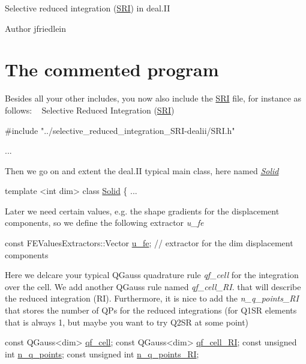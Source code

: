 Selective reduced integration (\hyperlink{namespaceSRI}{S\+RI}) in deal.\+II\begin{DoxyAuthor}{Author}
jfriedlein
\end{DoxyAuthor}
\hypertarget{index_code}{}\section{The commented program}\label{index_code}

\begin{DoxyCode}
\end{DoxyCode}
 Besides all your other includes, you now also include the \hyperlink{namespaceSRI}{S\+RI} file, for instance as follows\+: ~\newline
Selective Reduced Integration (\hyperlink{namespaceSRI}{S\+RI}) 
\begin{DoxyCode}
\textcolor{preprocessor}{#include "../selective\_reduced\_integration\_SRI-dealii/SRI.h"}
 
...
\end{DoxyCode}
 Then we go on and extent the deal.\+II typical main class, here named {\itshape \hyperlink{classSolid}{Solid}} 
\begin{DoxyCode}
\textcolor{keyword}{template} <\textcolor{keywordtype}{int} dim>
\textcolor{keyword}{class }\hyperlink{classSolid}{Solid}
\{
    ...
\end{DoxyCode}
 Later we need certain values, e.\+g. the shape gradients for the displacement components, so we define the following extractor {\itshape u\+\_\+fe} 
\begin{DoxyCode}
\textcolor{keyword}{const} FEValuesExtractors::Vector \hyperlink{assembly__routine__SRI_8cc_ae50a49c136e49c33fcd5a555a00009dd}{u\_fe}; \textcolor{comment}{// extractor for the dim displacement components}
\end{DoxyCode}
 Here we delcare your typical Q\+Gauss quadrature rule {\itshape qf\+\_\+cell} for the integration over the cell. We add another Q\+Gauss rule named {\itshape qf\+\_\+cell\+\_\+\+RI}. that will describe the reduced integration (RI). Furthermore, it is nice to add the {\itshape n\+\_\+q\+\_\+points\+\_\+\+RI} that stores the number of Q\+Ps for the reduced integrations (for Q1\+SR elements that is always 1, but maybe you want to try Q2\+SR at some point) 
\begin{DoxyCode}
\textcolor{keyword}{const} QGauss<dim>                \hyperlink{assembly__routine__SRI_8cc_aaaceb34a5b42a4954b2e893607c1bdef}{qf\_cell};
\textcolor{keyword}{const} QGauss<dim>                \hyperlink{assembly__routine__SRI_8cc_ab9727a7376e2656d3cd40c65ac7efb81}{qf\_cell\_RI};
\textcolor{keyword}{const} \textcolor{keywordtype}{unsigned} \textcolor{keywordtype}{int}               \hyperlink{assembly__routine__SRI_8cc_afd52b693751274175b93a58458201e6b}{n\_q\_points};
\textcolor{keyword}{const} \textcolor{keywordtype}{unsigned} \textcolor{keywordtype}{int}              \hyperlink{assembly__routine__SRI_8cc_a0b72b2a33d52b7597b87df35b5b92415}{n\_q\_points\_RI};
\end{DoxyCode}
